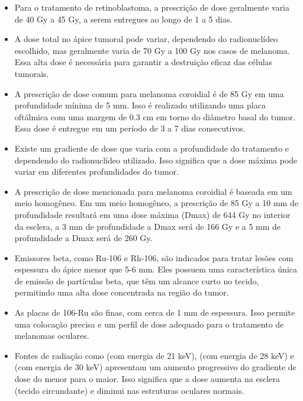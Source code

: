 \documentclass[11pt,a4paper]{article}
\begin{document}
\begin{itemize}
    \item Para o tratamento de retinoblastoma, a prescrição de dose geralmente varia de 40 Gy a 45 Gy, a serem entregues ao longo de 1 a 5 dias.
    
    \item A dose total no ápice tumoral pode variar, dependendo do radionuclídeo escolhido, mas geralmente varia de 70 Gy a 100 Gy nos casos de melanoma. Essa alta dose é necessária para garantir a destruição eficaz das células tumorais.
    
    \item A prescrição de dose comum para melanoma coroidial é de 85 Gy em uma profundidade mínima de 5 mm. Isso é realizado utilizando uma placa oftálmica com uma margem de 0.3 cm em torno do diâmetro basal do tumor. Essa dose é entregue em um período de 3 a 7 dias consecutivos.
    
    \item Existe um gradiente de dose que varia com a profundidade do tratamento e dependendo do radionuclídeo utilizado. Isso significa que a dose máxima pode variar em diferentes profundidades do tumor.
    
    \item A prescrição de dose mencionada para melanoma coroidial é baseada em um meio homogêneo. Em um meio homogêneo, a prescrição de 85 Gy a 10 mm de profundidade resultará em uma dose máxima (Dmax) de 644 Gy no interior da esclera, a 3 mm de profundidade a Dmax será de 166 Gy e a 5 mm de profundidade a Dmax será de 260 Gy.
    
    \item Emissores beta, como Ru-106 e Rh-106, são indicados para tratar lesões com espessura do ápice menor que 5-6 mm. Eles possuem uma característica única de emissão de partículas beta, que têm um alcance curto no tecido, permitindo uma alta dose concentrada na região do tumor.
    
    \item As placas de 106-Ru são finas, com cerca de 1 mm de espessura. Isso permite uma colocação precisa e um perfil de dose adequado para o tratamento de melanomas oculares.
    
    \item Fontes de radiação como  (com energia de 21 keV),  (com energia de 28 keV) e  (com energia de 30 keV) apresentam um aumento progressivo do gradiente de dose do menor para o maior. Isso significa que a dose aumenta na esclera (tecido circundante) e diminui nas estruturas oculares normais.
    

\end{itemize}
\end{document}
